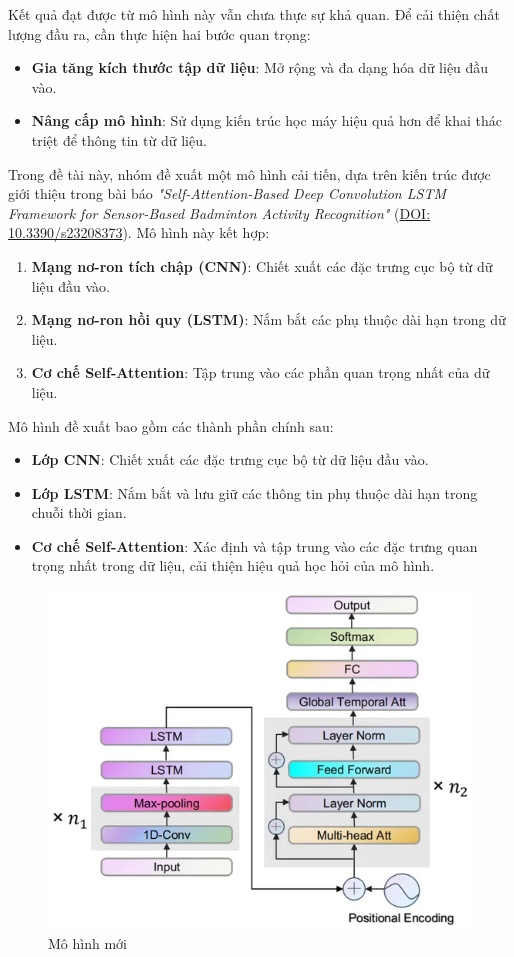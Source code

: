 Kết quả đạt được từ mô hình này vẫn chưa thực sự khả quan. Để cải thiện chất lượng đầu ra, cần thực hiện hai bước quan trọng:
\begin{itemize}
    \item \textbf{Gia tăng kích thước tập dữ liệu}: Mở rộng và đa dạng hóa dữ liệu đầu vào.
    \item \textbf{Nâng cấp mô hình}: Sử dụng kiến trúc học máy hiệu quả hơn để khai thác triệt để thông tin từ dữ liệu.
\end{itemize}

Trong đề tài này, nhóm đề xuất một mô hình cải tiến, dựa trên kiến trúc được giới thiệu trong bài báo \textit{"Self-Attention-Based Deep Convolution LSTM Framework for Sensor-Based Badminton Activity Recognition"} (\href{https://doi.org/10.3390/s23208373}{DOI: 10.3390/s23208373}). Mô hình này kết hợp:
\begin{enumerate}
    \item \textbf{Mạng nơ-ron tích chập (CNN)}: Chiết xuất các đặc trưng cục bộ từ dữ liệu đầu vào.
    \item \textbf{Mạng nơ-ron hồi quy (LSTM)}: Nắm bắt các phụ thuộc dài hạn trong dữ liệu.
    \item \textbf{Cơ chế Self-Attention}: Tập trung vào các phần quan trọng nhất của dữ liệu.
\end{enumerate}

Mô hình đề xuất bao gồm các thành phần chính sau:
\begin{itemize}
    \item \textbf{Lớp CNN}: Chiết xuất các đặc trưng cục bộ từ dữ liệu đầu vào.
    \item \textbf{Lớp LSTM}: Nắm bắt và lưu giữ các thông tin phụ thuộc dài hạn trong chuỗi thời gian.
    \item \textbf{Cơ chế Self-Attention}: Xác định và tập trung vào các đặc trưng quan trọng nhất trong dữ liệu, cải thiện hiệu quả học hỏi của mô hình.
\end{itemize}

\begin{figure}[H]
    \centering
    \includegraphics[width=0.8\linewidth]{Images/Architecture/SADeepConv.png}
    \caption{Mô hình mới}
    \label{fig:new-model}
\end{figure}


